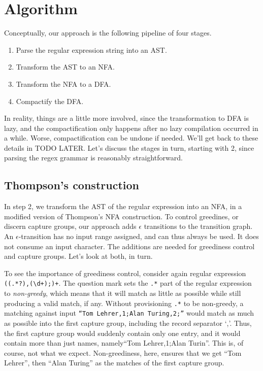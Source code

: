 \documentclass[english]{sigplanconf}
\begin{document}
\section{Algorithm}

Conceptually, our approach is the following pipeline of four stages.
\begin{enumerate}
  \item Parse the regular expression string into an AST.
  \item Transform the AST to an NFA.
  \item Transform the NFA to a DFA.
  \item Compactify the DFA.
\end{enumerate}

In reality, things are a little more involved, since the
transformation to DFA is lazy, and the compactification only happens
after no lazy compilation occurred in a while. Worse, compactification
can be undone if needed. We'll get back to these details in TODO
LATER. Let's discuss the stages in turn, starting with 2, since
parsing the regex grammar is reasonably straightforward.

\subsection{Thompson's construction} 

In step 2, we transform the AST of the regular expression into an NFA,
in a modified version of Thompson's NFA construction. To
control greedines, or discern capture groups, our approach adds
$\epsilon$ transitions to the transition graph. An
$\epsilon$-transition has no input range assigned, and can thus always
be used. It does not consume an input character.
The additions are needed for greediness control and capture groups.
Let's look at both, in turn.

To see the importance of greediness control, consider again regular
expression \texttt{((.*?),(\textbackslash{}d+);)+}. The question
mark sets the \texttt{.*} part of the regular expression to
\emph{non-greedy}, which means that it will match as little as
possible while still producing a valid match, if any.  Without
provisioning \texttt{.*} to be non-greedy, a matching against input
\texttt{``Tom Lehrer,1;Alan Turing,2;''} would match as much as
possible into the first capture group, including the record separator
`,'.  Thus, the first capture group would suddenly contain only one
entry, and it would contain more than just names, namely``Tom
Lehrer,1;Alan Turin''.  This is, of course, not what we expect.
Non-greediness, here, ensures that we get ``Tom Lehrer'', then
``Alan Turing'' as the matches of the first capture group.
\end{document}

